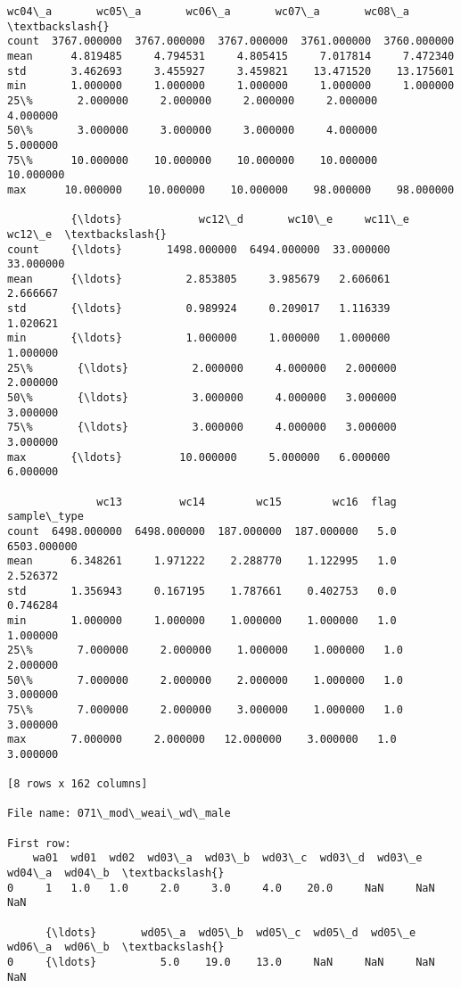 \documentclass[11pt]{article}
\begin{document}
\begin{Verbatim}[commandchars=\\\{\}]
            wc04\_a       wc05\_a       wc06\_a       wc07\_a       wc08\_a  \textbackslash{}
count  3767.000000  3767.000000  3767.000000  3761.000000  3760.000000   
mean      4.819485     4.794531     4.805415     7.017814     7.472340   
std       3.462693     3.455927     3.459821    13.471520    13.175601   
min       1.000000     1.000000     1.000000     1.000000     1.000000   
25\%       2.000000     2.000000     2.000000     2.000000     4.000000   
50\%       3.000000     3.000000     3.000000     4.000000     5.000000   
75\%      10.000000    10.000000    10.000000    10.000000    10.000000   
max      10.000000    10.000000    10.000000    98.000000    98.000000   

          {\ldots}            wc12\_d       wc10\_e     wc11\_e     wc12\_e  \textbackslash{}
count     {\ldots}       1498.000000  6494.000000  33.000000  33.000000   
mean      {\ldots}          2.853805     3.985679   2.606061   2.666667   
std       {\ldots}          0.989924     0.209017   1.116339   1.020621   
min       {\ldots}          1.000000     1.000000   1.000000   1.000000   
25\%       {\ldots}          2.000000     4.000000   2.000000   2.000000   
50\%       {\ldots}          3.000000     4.000000   3.000000   3.000000   
75\%       {\ldots}          3.000000     4.000000   3.000000   3.000000   
max       {\ldots}         10.000000     5.000000   6.000000   6.000000   

              wc13         wc14        wc15        wc16  flag  sample\_type  
count  6498.000000  6498.000000  187.000000  187.000000   5.0  6503.000000  
mean      6.348261     1.971222    2.288770    1.122995   1.0     2.526372  
std       1.356943     0.167195    1.787661    0.402753   0.0     0.746284  
min       1.000000     1.000000    1.000000    1.000000   1.0     1.000000  
25\%       7.000000     2.000000    1.000000    1.000000   1.0     2.000000  
50\%       7.000000     2.000000    2.000000    1.000000   1.0     3.000000  
75\%       7.000000     2.000000    3.000000    1.000000   1.0     3.000000  
max       7.000000     2.000000   12.000000    3.000000   1.0     3.000000  

[8 rows x 162 columns]

File name: 071\_mod\_weai\_wd\_male

First row: 
    wa01  wd01  wd02  wd03\_a  wd03\_b  wd03\_c  wd03\_d  wd03\_e  wd04\_a  wd04\_b  \textbackslash{}
0     1   1.0   1.0     2.0     3.0     4.0    20.0     NaN     NaN     NaN   

      {\ldots}       wd05\_a  wd05\_b  wd05\_c  wd05\_d  wd05\_e  wd06\_a  wd06\_b  \textbackslash{}
0     {\ldots}          5.0    19.0    13.0     NaN     NaN     NaN     NaN   


\end{Verbatim}
\end{document}
